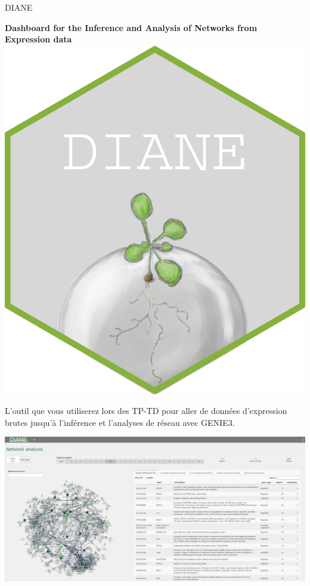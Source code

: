 \begin{frame}{DIANE \scriptsize \cite{Cassan2021} }

\scriptsize \textbf{Dashboard for the Inference and Analysis of Networks from Expression data} \includegraphics[scale= 0.10]{Figures/Regression/hex-DIANE.png}

\scriptsize L'outil que vous utiliserez lors des TP-TD pour aller de données d'expression brutes jusqu'à l'inférence et l'analyses de réseau avec GENIE3.

\includegraphics[scale = 0.2]{Figures/Regression/view_net.PNG}

\end{frame}



